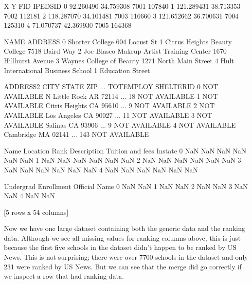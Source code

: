 \documentclass[letterpaper,10pt,english]{sphinxmanual}
\begin{document}
\begin{sphinxVerbatim}[commandchars=\\\{\}]
            X          Y   FID  IPEDSID  \PYGZbs{}
0  \PYGZhy{}92.260490  34.759308  7001   107840   
1 \PYGZhy{}121.289431  38.713353  7002   112181   
2 \PYGZhy{}118.287070  34.101481  7003   116660   
3 \PYGZhy{}121.652662  36.700631  7004   125310   
4  \PYGZhy{}71.070737  42.369930  7005   164368   

                                       NAME                 ADDRESS  \PYGZbs{}
0                           Shorter College           604 Locust St   
1             Citrus Heights Beauty College          7518 Baird Way   
2  Joe Blasco Makeup Artist Training Center   1670 Hillhurst Avenue   
3                  Waynes College of Beauty  1271 North Main Street   
4        Hult International Business School      1 Education Street   

        ADDRESS2            CITY STATE    ZIP  ... TOT\PYGZus{}EMPLOY     SHELTER\PYGZus{}ID  \PYGZbs{}
0  NOT AVAILABLE   N Little Rock    AR  72114  ...         18  NOT AVAILABLE   
1  NOT AVAILABLE  Citris Heights    CA  95610  ...          9  NOT AVAILABLE   
2  NOT AVAILABLE     Los Angeles    CA  90027  ...         11  NOT AVAILABLE   
3  NOT AVAILABLE         Salinas    CA  93906  ...          9  NOT AVAILABLE   
4  NOT AVAILABLE       Cambridge    MA  02141  ...        143  NOT AVAILABLE   

   Name Location  Rank Description  Tuition and fees In\PYGZhy{}state  \PYGZbs{}
0   NaN      NaN   NaN         NaN               NaN      NaN   
1   NaN      NaN   NaN         NaN               NaN      NaN   
2   NaN      NaN   NaN         NaN               NaN      NaN   
3   NaN      NaN   NaN         NaN               NaN      NaN   
4   NaN      NaN   NaN         NaN               NaN      NaN   

   Undergrad Enrollment  Official Name  
0                   NaN            NaN  
1                   NaN            NaN  
2                   NaN            NaN  
3                   NaN            NaN  
4                   NaN            NaN  

[5 rows x 54 columns]
\end{sphinxVerbatim}

Now we have one large dataset containing both the generic data and the ranking data.  Although we see all missing values for ranking columns above, this is just because the first five schools in the dataset didn’t happen to be ranked by US News.  This is not surprising; there were over 7700 schools in the dataset and only 231 were ranked by US News.  But we can see that the merge did go correctly if we inspect a row that had ranking data.
\end{document}

